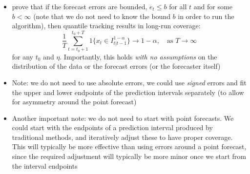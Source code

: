 \documentclass{article}
\begin{document}
\begin{itemize}
\item \citet{angelopoulos2023conformal} prove that if the forecast errors are
  bounded, $e_t \leq b$ for all $t$ and for some $b < \infty$ (note that we do
  not need to know the bound $b$ in order to run the algorithm), then quantile 
  tracking results in long-run coverage: 
  \[
  \frac{1}{T} \sum_{t=t_0+1}^{t_0+T} 1 \big\{ x_t \in I^{1-\alpha}_{t|t-1}
  \big\} \to 1-\alpha, \quad \text{as $T \to \infty$} 
  \]
  for any $t_0$ and $\eta$. Importantly, this holds \emph{with no assumptions}
  on the distribution of the data or the forecast errors (or the forecaster
  itself)

\item Note: we do not need to use absolute errors, we could use \emph{signed}
  errors and fit the upper and lower endpoints of the prediction intervals
  separately (to allow for asymmetry around the point forecast) 

\item Another important note: we do not need to start with point forecasts. We
  could start with the endpoints of a prediction interval produced by
  traditional methods, and iteratively adjust these to have proper coverage.
  This will typically be more effective than using errors around a point
  forecast, since the required adjustment will typically be more minor once we
  start from the interval endpoints 


\end{itemize}
\end{document}
